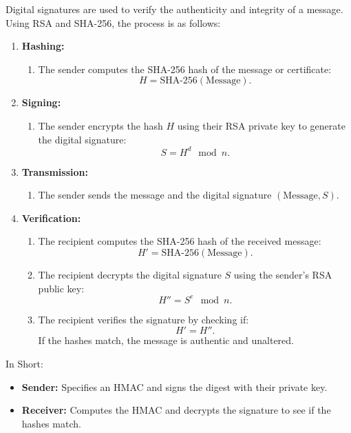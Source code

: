 \begin{theo}

    \label{def:rsa_sha256}
    Digital signatures are used to verify the authenticity and integrity of a message. Using RSA and SHA-256, the process is as follows:
    \begin{enumerate}
        \item \textbf{Hashing:}
        \begin{enumerate}
            \item The sender computes the SHA-256 hash of the message or certificate:
            \[
            H = \text{SHA-256}(\text{Message}).
            \]
        \end{enumerate}
        
        \item \textbf{Signing:}
        \begin{enumerate}
            \item The sender encrypts the hash $H$ using their RSA private key to generate the digital signature:
            \[
            S = H^d \mod n.
            \]
        \end{enumerate}
        
        \item \textbf{Transmission:}
        \begin{enumerate}
            \item The sender sends the message and the digital signature $(\text{Message}, S)$.
        \end{enumerate}
        
        \item \textbf{Verification:}
        \begin{enumerate}
            \item The recipient computes the SHA-256 hash of the received message:
            \[
            H' = \text{SHA-256}(\text{Message}).
            \]
            \item The recipient decrypts the digital signature $S$ using the sender's RSA public key:
            \[
            H'' = S^e \mod n.
            \]
            \item The recipient verifies the signature by checking if:
            \[
            H' = H''.
            \]
            If the hashes match, the message is authentic and unaltered.
        \end{enumerate}
    \end{enumerate}
    \noindent
    In Short:
    \begin{itemize}
        \item \textbf{Sender:} Specifies an HMAC and signs the digest with their private key.
        \item \textbf{Receiver:} Computes the HMAC and decrypts the signature to see if the hashes match.
    \end{itemize}
\end{theo}

